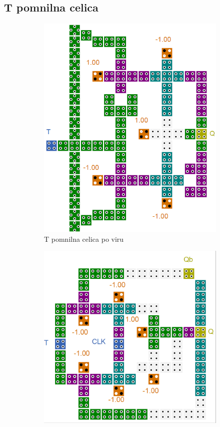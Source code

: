 \documentclass[a4paper, 11pt]{article}
\begin{document}
\subsection{T pomnilna celica}
\begin{figure}[h!]
	\begin{subfigure}[b]{0.4\textwidth}
	\includegraphics[width=\textwidth]{../img/vir_4/t.png}
	\caption{T pomnilna celica po viru \cite{quantum_dot}}
	\label{fig-t-1}
	\end{subfigure}
	\begin{subfigure}[b]{0.4\textwidth}
	\includegraphics[width=\textwidth]{../img/vir_5/t.png} 

\end{subfigure}
\end{figure}
\end{document}
